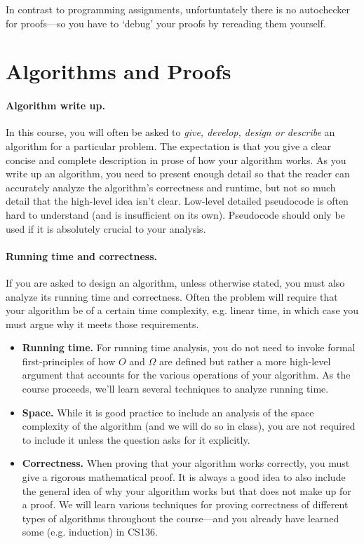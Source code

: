 \documentclass{article}
\theoremstyle{definition}
\begin{document}
In contrast to programming assignments, unfortuntately there is no autochecker for proofs---so you have to `debug' your proofs by rereading them yourself.

\section{Algorithms and Proofs}

\paragraph{Algorithm write up.}
 In this course, you will often be asked to {\em give, develop, design or describe} an algorithm for a particular problem.  The expectation is that you give a clear concise and complete description in prose of how your algorithm works.  As you write up an algorithm, you need to present enough detail so that the reader can accurately analyze the algorithm's correctness and runtime, but not so much detail that the high-level idea isn't
clear. 
Low-level detailed pseudocode is often hard to understand (and is insufficient on its own). Pseudocode should only be used if it is absolutely crucial to your analysis.  

\paragraph{Running time and correctness.} If you are asked to design an algorithm, unless otherwise stated, you must also analyze its running time and correctness. Often the problem will require that your algorithm be of a certain time complexity, e.g. linear time, in which case you must argue why it meets those requirements. 

\begin{itemize}[leftmargin = 10pt, label = $\bullet$]
    \item {\bf Running time.} For running time analysis, you do not need to invoke formal first-principles of how $O$
and $\Omega$ are defined but rather a more high-level argument that accounts for the various operations of your algorithm.  As the course proceeds, we'll learn several techniques to analyze running time.
 \item {\bf Space.} While it is good practice to include an analysis of the space complexity of the algorithm (and we will do so in class), you are not required to include it unless the question asks for it explicitly.
 \item {\bf Correctness.} When proving that your algorithm works correctly, you must give a rigorous mathematical proof.  It is always a good idea to also include the general idea of why your algorithm works but that does not make up for a proof.  We will learn various techniques for proving correctness of different types of algorithms throughout the course---and you already have learned some (e.g. induction) in CS136. 
\end{itemize}
\end{document}
